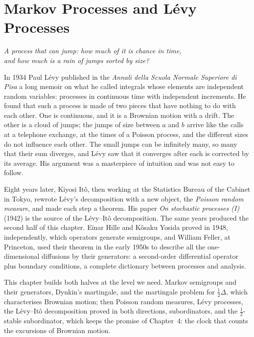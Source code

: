 \chapter{Markov Processes and L\'evy Processes}

\begin{center}\itshape
A process that can jump: how much of it is chance in time,\\
and how much is a rain of jumps sorted by size?
\end{center}

In 1934 Paul L\'evy published in the \emph{Annali della Scuola Normale Superiore di Pisa} a long memoir on what he called integrals whose elements are independent random variables: processes in
continuous time with independent increments. He found that such a process is made of two pieces that have nothing to do with each other. One is continuous, and it is a Brownian motion with a drift.
The other is a cloud of jumps; the jumps of size between $a$ and $b$ arrive like the calls at a telephone exchange, at the times of a Poisson process, and the different sizes do not influence each
other. The small jumps can be infinitely many, so many that their sum diverges, and L\'evy saw that it converges after each is corrected by its average. His argument was a masterpiece of intuition and was
not easy to follow.

Eight years later, Kiyosi It\^o, then working at the Statistics Bureau of the Cabinet in Tokyo, rewrote L\'evy's decomposition with a new object, the \emph{Poisson random measure}, and made each
step a theorem. His paper \emph{On stochastic processes (I)} (1942) is the source of the L\'evy--It\^o decomposition. The same years produced the second half of this chapter. Einar Hille and K\^osaku Yosida proved in 1948, independently, which operators generate semigroups, and William Feller, at
Princeton, used their theorem in the early 1950s to describe all the one-dimensional diffusions by their generators: a second-order differential operator plus boundary conditions, a complete
dictionary between processes and analysis.

This chapter builds both halves at the level we need. Markov semigroups and their generators, Dynkin's martingale, and the martingale problem for $\frac12\Delta$, which characterises Brownian motion;
then Poisson random measures, L\'evy processes, the L\'evy--It\^o decomposition proved in both directions, subordinators, and the $\frac12$-stable subordinator, which keeps the promise of Chapter~4: the
clock that counts the excursions of Brownian motion.

